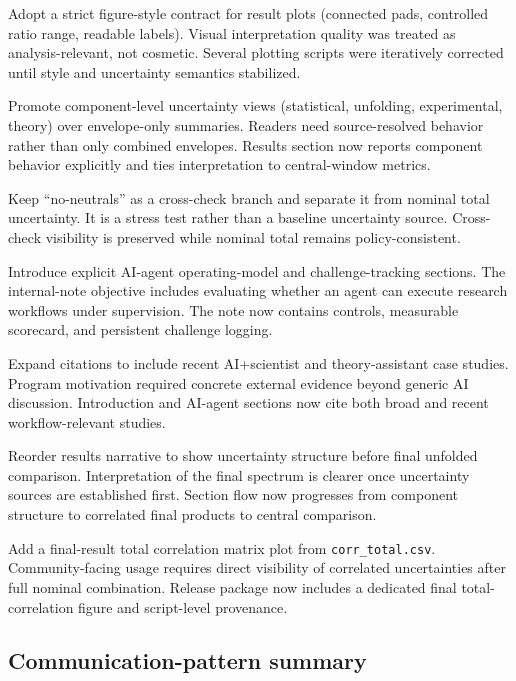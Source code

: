 \decisionbox
{Adopt a strict figure-style contract for result plots (connected pads, controlled ratio range, readable labels).}
{Visual interpretation quality was treated as analysis-relevant, not cosmetic.}
{Several plotting scripts were iteratively corrected until style and uncertainty semantics stabilized.}

\decisionbox
{Promote component-level uncertainty views (statistical, unfolding, experimental, theory) over envelope-only summaries.}
{Readers need source-resolved behavior rather than only combined envelopes.}
{Results section now reports component behavior explicitly and ties interpretation to central-window metrics.}

\decisionbox
{Keep ``no-neutrals'' as a cross-check branch and separate it from nominal total uncertainty.}
{It is a stress test rather than a baseline uncertainty source.}
{Cross-check visibility is preserved while nominal total remains policy-consistent.}

\decisionbox
{Introduce explicit AI-agent operating-model and challenge-tracking sections.}
{The internal-note objective includes evaluating whether an agent can execute research workflows under supervision.}
{The note now contains controls, measurable scorecard, and persistent challenge logging.}

\decisionbox
{Expand citations to include recent AI+scientist and theory-assistant case studies.}
{Program motivation required concrete external evidence beyond generic AI discussion.}
{Introduction and AI-agent sections now cite both broad and recent workflow-relevant studies.}

\decisionbox
{Reorder results narrative to show uncertainty structure before final unfolded comparison.}
{Interpretation of the final spectrum is clearer once uncertainty sources are established first.}
{Section flow now progresses from component structure to correlated final products to central comparison.}

\decisionbox
{Add a final-result total correlation matrix plot from \texttt{corr\_total.csv}.}
{Community-facing usage requires direct visibility of correlated uncertainties after full nominal combination.}
{Release package now includes a dedicated final total-correlation figure and script-level provenance.}

\subsection{Communication-pattern summary}

